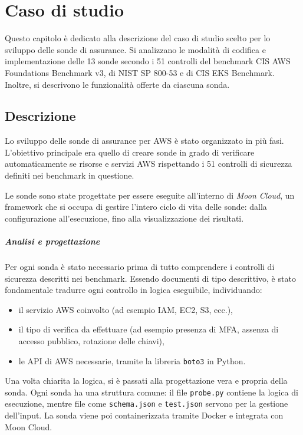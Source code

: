 \chapter{Caso di studio}
\label{cap:caso_studio}

Questo capitolo è dedicato alla descrizione del caso di studio scelto per lo sviluppo delle sonde di assurance. Si analizzano le modalità di codifica e implementazione delle 13 sonde secondo i 51 controlli del benchmark CIS AWS Foundations Benchmark v3, di NIST SP 800-53 e di CIS EKS Benchmark. Inoltre, si descrivono le funzionalità offerte da ciascuna sonda.

\section{Descrizione}

Lo sviluppo delle sonde di assurance per AWS è stato organizzato in più fasi. L'obiettivo principale era quello di creare sonde in grado di verificare automaticamente se risorse e servizi AWS rispettando i 51 controlli di sicurezza definiti nei benchmark in questione. 

Le sonde sono state progettate per essere eseguite all'interno di \textit{Moon Cloud}, un framework che si occupa di gestire l'intero ciclo di vita delle sonde: dalla configurazione all'esecuzione, fino alla visualizzazione dei risultati.

\paragraph{Analisi e progettazione} Per ogni sonda è stato necessario prima di tutto comprendere i controlli di sicurezza descritti nei benchmark. Essendo documenti di tipo descrittivo, è stato fondamentale tradurre ogni controllo in logica eseguibile, individuando:
\begin{itemize}
    \item il servizio AWS coinvolto (ad esempio IAM, EC2, S3, ecc.),
    \item il tipo di verifica da effettuare (ad esempio presenza di MFA, assenza di accesso pubblico, rotazione delle chiavi),
    \item le API di AWS necessarie, tramite la libreria \texttt{boto3} in Python.
\end{itemize}

Una volta chiarita la logica, si è passati alla progettazione vera e propria della sonda. Ogni sonda ha una struttura comune: il file \texttt{probe.py} contiene la logica di esecuzione, mentre file come \texttt{schema.json} e \texttt{test.json} servono per la gestione dell'input. La sonda viene poi containerizzata tramite Docker e integrata con Moon Cloud.

